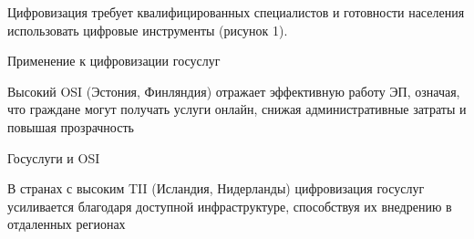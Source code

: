 {%

Цифровизация требует квалифицированных специалистов и готовности
населения использовать цифровые инструменты (рисунок 1).

Применение к цифровизации госуслуг

Высокий OSI (Эстония, Финляндия) отражает эффективную работу ЭП,
означая, что граждане могут получать услуги онлайн, снижая
административные затраты и повышая прозрачность

Госуслуги и OSI

В странах с высоким TII (Исландия, Нидерланды) цифровизация госуслуг
усиливается благодаря доступной инфраструктуре, способствуя их внедрению
в отдаленных регионах

}
